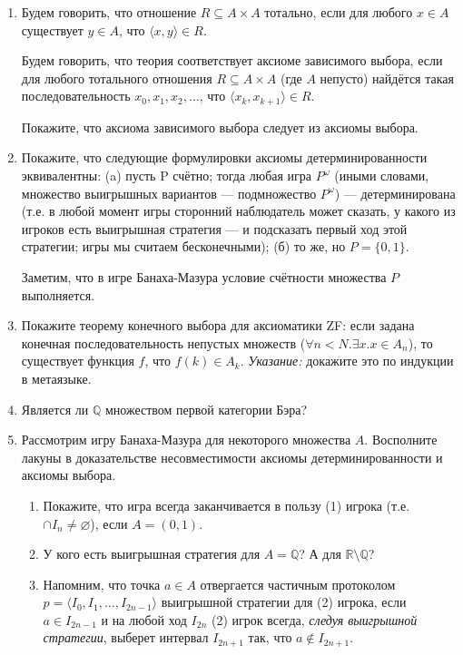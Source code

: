 \documentclass[10pt,a4paper,oneside]{article}
\begin{document}
\begin{enumerate}
\item 
Будем говорить, что отношение $R \subseteq A \times A$ тотально, если для любого $x \in A$ существует $y \in A$,
что $\langle x,y \rangle \in R$. 

Будем говорить, что теория соответствует аксиоме зависимого выбора, если для любого тотального отношения $R \subseteq A \times A$
(где $A$ непусто) найдётся такая последовательность $x_0, x_1, x_2, \dots$, что $\langle x_k, x_{k+1} \rangle \in R$.

Покажите, что аксиома зависимого выбора следует из аксиомы выбора.

\item Покажите, что следующие формулировки аксиомы детерминированности эквивалентны:
(a) пусть P счётно; тогда любая игра $P^\omega$ (иными словами, множество выигрышных вариантов --- подмножество $P^\omega$) --- детерминирована
(т.е. в любой момент игры сторонний наблюдатель может сказать, у какого из игроков есть выигрышная стратегия --- и подсказать первый ход
этой стратегии; игры мы считаем бесконечными);
(б) то же, но $P = \{0,1\}$.

Заметим, что в игре Банаха-Мазура условие счётности множества $P$ выполняется.

\item Покажите теорему конечного выбора для аксиоматики ZF: если задана конечная последовательность непустых множеств
($\forall n < N.\exists x.x \in A_n$), то существует функция $f$, что $f(k) \in A_k$.
\emph{Указание:} докажите это по индукции в метаязыке.


\item Является ли $\mathbb{Q}$ множеством первой категории Бэра?

\item Рассмотрим игру Банаха-Мазура для некоторого множества $A$. Восполните лакуны в доказательстве несовместимости
аксиомы детерминированности и аксиомы выбора.
\begin{enumerate}
\item Покажите, что игра всегда заканчивается в пользу (1) игрока (т.е. $\cap I_n \ne \varnothing$), если $A = (0,1)$.
\item У кого есть выигрышная стратегия для $A = \mathbb{Q}$? А для $\mathbb{R} \setminus \mathbb{Q}$?
\item Напомним, что точка $a \in A$ отвергается частичным протоколом $p = \langle I_0, I_1, \dots, I_{2n-1} \rangle$
выигрышной стратегии для (2) игрока, если $a \in I_{2n-1}$ и на любой ход $I_{2n}$ (2) игрок всегда, 
\emph{следуя выигрышной стратегии}, выберет интервал $I_{2n+1}$ так, что $a \notin I_{2n+1}$.


\end{enumerate}
\end{enumerate}
\end{document}
